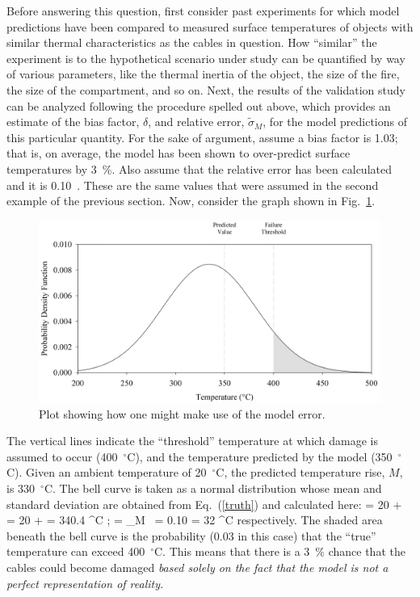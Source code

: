 Before answering this question, first consider past experiments for which model predictions have been compared to measured surface temperatures of objects
with similar thermal characteristics as the cables in question. How ``similar'' the experiment is to the hypothetical scenario under study can be quantified by way of
various parameters, like the thermal inertia of the object, the size of the fire, the size of the compartment, and so on. Next, the results of the validation study can be
analyzed following the procedure spelled out above, which provides an estimate of the bias factor, $\delta$, and relative error, $\tilde{\sigma}_M$, for the model
predictions of this particular quantity. For the sake of argument, assume a bias factor is 1.03; that is, on average, the model has been shown to over-predict
surface temperatures by 3~\%. Also assume that the relative error has been calculated and it is 0.10~. These are the same values that were assumed in the second example
of the previous section.
Now, consider the graph shown in Fig.~\ref{bell_curve}.
\begin{figure}[t]
\begin{center}
\includegraphics[width=5.in]{FIGURES/bell_curve}
\end{center}
\caption[Demonstration of model error.]{Plot showing how one might make use of the model error.}
\label{bell_curve}
\end{figure}
The vertical lines indicate the ``threshold'' temperature at which damage is assumed to occur (400~$^\circ$C), and the temperature predicted by the
model (350~$^\circ$C). Given an ambient temperature of 20~$^\circ$C, the predicted temperature rise, $M$, is 330~$^\circ$C.
The bell curve is taken as a normal distribution whose mean and standard deviation are obtained from Eq.~(\ref{truth}) and calculated here:
\be \mu = 20 +  = 20 +  = 340.4 \; ^\circ \hbox{C}  \quad ; \quad
   \sigma = \widetilde{\sigma}_M \,  = 0.10 \times {} = 32 \; ^\circ \hbox{C}  \ee
respectively. The shaded area beneath the bell curve is the probability (0.03 in this case) that the ``true'' temperature can exceed 400~$^\circ$C.
This means that there is a 3~\% chance that the cables could
become damaged {\em based solely on the fact that the model is not a perfect representation of reality.}

